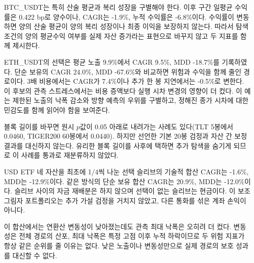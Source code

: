 \documentclass[11pt,a4paper]{article}
\begin{document}
BTC\_USDT는 특히 산술 평균과 복리 성장을 구별해야 한다. 이후 구간 일평균 수익률은 0.422 bp로 양수이나, CAGR는 -1.9\%, 누적 수익률은 -6.8\%이다. 수익률이 변동하면 양의 산술 평균이 양의 복리 성장이나 최종 이익을 보장하지 않는다. 따라서 탐색 조건의 양의 평균수익 여부를 실제 자산 증가라는 표현으로 바꾸지 않고 두 지표를 함께 제시한다.

ETH\_USDT의 선택은 평균 노출 9.9\%에서 CAGR 9.5\%, MDD -18.7\%를 기록하였다. 단순 보유의 CAGR 24.0\%, MDD -67.6\%와 비교하면 위험과 수익을 함께 줄인 경로이다. 3배 비용에서는 CAGR가 7.4\%이나 추가 한 봉 지연에서는 -0.5\%로 변한다. 이 후보의 관측 스트레스에서는 비용 증액보다 실행 시차 변경의 영향이 더 컸다. 이 예는 제한된 노출의 낙폭 감소와 방향 예측의 우위를 구별하고, 정해진 종가 시차에 대한 민감도를 함께 읽어야 함을 보여준다.

블록 길이를 바꾸면 원시 $p$값이 0.05 아래로 내려가는 사례도 있다(TLT 5봉에서 0.0460, TIGER200 60봉에서 0.0440). 하지만 선언한 기본 20봉 검정과 자산 간 보정 결과를 대신하지 않는다. 유리한 블록 길이를 사후에 택하면 추가 탐색을 숨기게 되므로 이 사례를 통과로 재분류하지 않았다.

USD ETF 네 자산을 최초에 1/4씩 나눈 선택 슬리브의 기술적 합산 CAGR는 -1.6\%, MDD는 -12.9\%이다. 같은 방식의 단순 보유 합산 CAGR는 20.9\%, MDD는 -12.0\%이다. 슬리브 사이의 자금 재배분은 하지 않으며 선택이 없는 슬리브는 현금이다. 이 보조 그림자 포트폴리오는 추가 가설 검정을 거치지 않았고, 다른 통화를 섞은 계좌 손익이 아니다.

이 합산에서는 연환산 변동성이 낮아졌는데도 관측 최대 낙폭은 오히려 더 컸다. 변동성은 전체 경로의 산포, 최대 낙폭은 특정 고점 이후 누적 하락이므로 두 위험 지표가 항상 같은 순위를 줄 이유는 없다. 낮은 노출이나 변동성만으로 실제 경로의 보호 성과를 대신할 수 없다.
\end{document}
